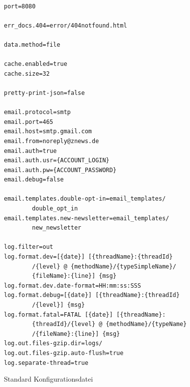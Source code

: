 \documentclass[12pt]{article}
\begin{document}
    \begin{figure}[p]
        \centering
        \begin{lstlisting}[frame=single]%formatter:off

port=8080

err_docs.404=error/404notfound.html

data.method=file

cache.enabled=true
cache.size=32

pretty-print-json=false

email.protocol=smtp
email.port=465
email.host=smtp.gmail.com
email.from=noreply@znews.de
email.auth=true
email.auth.usr={ACCOUNT_LOGIN}
email.auth.pw={ACCOUNT_PASSWORD}
email.debug=false

email.templates.double-opt-in=email_templates/
        double_opt_in
email.templates.new-newsletter=email_templates/
        new_newsletter

log.filter=out
log.format.dev=[{date}] [{threadName}:{threadId}
        /{level} @ {methodName}/{typeSimpleName}/
        {fileName}:{line}] {msg}
log.format.dev.date-format=HH:mm:ss:SSS
log.format.debug=[{date}] [{threadName}:{threadId}
        /{level}] {msg}
log.format.fatal=FATAL [{date}] [{threadName}:
        {threadId}/{level} @ {methodName}/{typeName}
        /{fileName}:{line}] {msg}
log.out.files-gzip.dir=logs/
log.out.files-gzip.auto-flush=true
log.separate-thread=true
        \end{lstlisting}%
        \caption{\label{fig:config-std}Standard Konfigurationsdatei}
    \end{figure}


\end{document}
